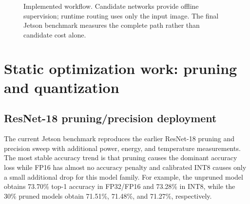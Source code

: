 \documentclass[11pt,a4paper]{article}
\begin{document}
\begin{figure}[H]
\centering
{}
\caption{Implemented workflow. Candidate networks provide offline supervision; runtime routing uses only the input image. The final Jetson benchmark measures the complete path rather than candidate cost alone.}
\label{fig:pipeline}
\end{figure}

\section{Static optimization work: pruning and quantization}

\subsection{ResNet-18 pruning/precision deployment}

The current Jetson benchmark reproduces the earlier ResNet-18 pruning and precision sweep with additional power, energy, and temperature measurements. The most stable accuracy trend is that pruning causes the dominant accuracy loss while FP16 has almost no accuracy penalty and calibrated INT8 causes only a small additional drop for this model family. For example, the unpruned model obtains 73.70\% top-1 accuracy in FP32/FP16 and 73.28\% in INT8, while the 30\% pruned models obtain 71.51\%, 71.48\%, and 71.27\%, respectively.
\end{document}
